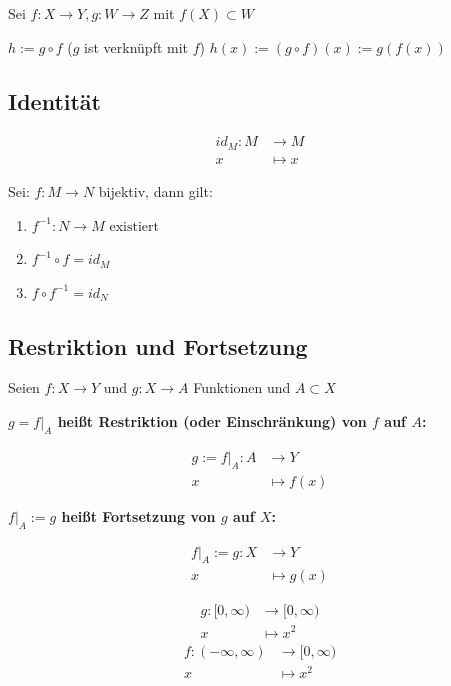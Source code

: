 \documentclass[fleqn]{scrbook}
\newenvironment{example}{{\bfseries Beispiel }}{}
\begin{document}
Sei $f : X \to Y, g : W \to Z$ mit $f(X) \subset W$

$h:= g \circ f$ ($g$ ist verknüpft mit $f$)
$h(x):= (g \circ f)(x):=g(f(x))$

\subsection{Identität}

\begin{align*}
  id_M : M & \to     M\\
              x & \mapsto x
\end{align*}

Sei: $f : M \to N$ bijektiv, dann gilt:

\begin{enumerate}
 \item $f^{-1} : N \to M \text{ existiert} $
 \item $f^{-1} \circ f = id_M$
 \item $f \circ f^{-1} = id_N$
\end{enumerate}

\subsection{Restriktion und Fortsetzung}

Seien $f : X \to Y$ und $g : X \to A$ Funktionen und $A \subset X$

\textbf{$g=f|_A$ heißt Restriktion (oder Einschränkung) von $f$ auf $A$:}

\begin{align*}
  g := f|_A : A & \to     Y\\
                   x & \mapsto f(x)
\end{align*}

\textbf{$f|_A := g$ heißt Fortsetzung von $g$ auf $X$:}

\begin{align*}
  f|_A := g : X & \to     Y\\
                   x & \mapsto g(x)
\end{align*}

\begin{example}
\begin{align*}
  g : [0,\infty) & \to     [0,\infty)\\
                    x & \mapsto x^2
\end{align*}
\begin{align*}
  f : (-\infty,\infty) & \to     [0,\infty)\\
                          x & \mapsto x^2
\end{align*}
\end{example}
\end{document}
